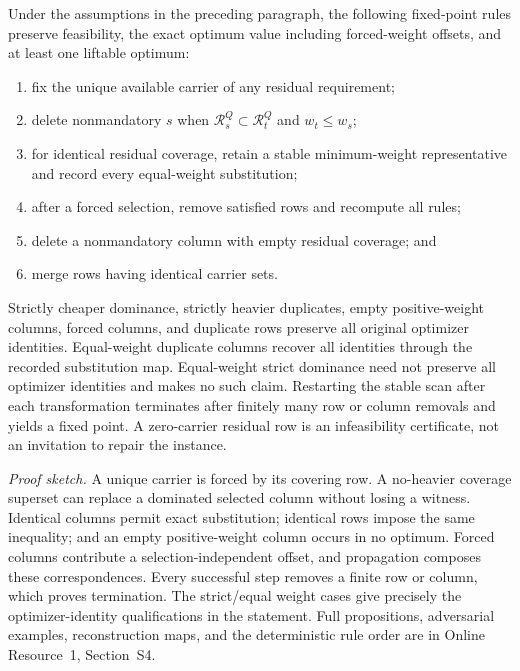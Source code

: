 \begin{proposition}
\label{prop:aor-preprocessing-feasibility-core}
Under the assumptions in the preceding paragraph, the following fixed-point
rules preserve feasibility, the exact optimum value including forced-weight
offsets, and at least one liftable optimum:
\begin{enumerate}
 \item fix the unique available carrier of any residual requirement;
 \item delete nonmandatory \(s\) when
       \(\mathcal R_s^Q\subset\mathcal R_t^Q\) and \(w_t\leq w_s\);
 \item for identical residual coverage, retain a stable minimum-weight
       representative and record every equal-weight substitution;
 \item after a forced selection, remove satisfied rows and recompute all
       rules;
 \item delete a nonmandatory column with empty residual coverage; and
 \item merge rows having identical carrier sets.
\end{enumerate}
Strictly cheaper dominance, strictly heavier duplicates, empty positive-weight
columns, forced columns, and duplicate rows preserve all original optimizer
identities.  Equal-weight duplicate columns recover all identities through the
recorded substitution map.  Equal-weight strict dominance need not preserve
all optimizer identities and makes no such claim.  Restarting the stable scan
after each transformation terminates after finitely many row or column
removals and yields a fixed point.  A zero-carrier residual row is an
infeasibility certificate, not an invitation to repair the instance.
\end{proposition}

\noindent\emph{Proof sketch.}
A unique carrier is forced by its covering row.  A no-heavier coverage
superset can replace a dominated selected column without losing a witness.
Identical columns permit exact substitution; identical rows impose the same
inequality; and an empty positive-weight column occurs in no optimum.  Forced
columns contribute a selection-independent offset, and propagation composes
these correspondences.  Every successful step removes a finite row or column,
which proves termination.  The strict/equal weight cases give precisely the
optimizer-identity qualifications in the statement.  Full propositions,
adversarial examples, reconstruction maps, and the deterministic rule order
are in Online Resource~1, Section~S4.
